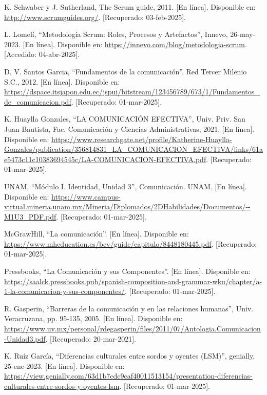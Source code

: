 \begin{thebibliography}{200}
    K. Schwaber y J. Sutherland, The Scrum guide, 2011. [En línea]. Disponible en: \url{http://www.scrumguides.org/}. [Recuperado: 03-feb-2025].

    L. Lomelí, “Metodología Scrum: Roles, Procesos y Artefactos”, Innevo, 26-may-2023. [En línea]. Disponible en: \url{https://innevo.com/blog/metodologia-scrum}. [Accedido: 04-abr-2025].

    D. V. Santos Garcia, “Fundamentos de la comunicación”. Red Tercer Milenio S.C., 2012. [En línea]. Disponible en: \url{https://dspace.itsjapon.edu.ec/jspui/bitstream/123456789/673/1/Fundamentos_de_comunicacion.pdf}. [Recuperado: 01-mar-2025].

    K. Huaylla Gonzales, “LA COMUNICACIÓN EFECTIVA”, Univ. Priv. San Juan Bautista, Fac. Comunicación y Ciencias Administrativas, 2021. [En línea]. Disponible en: \url{https://www.researchgate.net/profile/Katherine-Huaylla-Gonzales/publication/356814831_LA_COMUNICACION_EFECTIVA/links/61ae5473c11c10383694545c/LA-COMUNICACION-EFECTIVA.pdf}. [Recuperado: 01-mar-2025].

    UNAM, “Módulo I. Identidad, Unidad 3”, Comunicación. UNAM. [En línea]. Disponible en: \url{https://www.campus-virtual.mineria.unam.mx/Mineria/Diplomados/2DHabilidades/Documentos/--M1U3_PDF.pdf}. [Recuperado: 01-mar-2025].

    McGrawHill, “La comunicación”. [En línea]. Disponible en: \url{https://www.mheducation.es/bcv/guide/capitulo/8448180445.pdf}. [Recuperado: 01-mar-2025].

    Pressbooks, “La Comunicación y sus Componentes”. [En línea]. Disponible en: \url{https://saalck.pressbooks.pub/spanish-composition-and-grammar-wku/chapter/a-1-la-comunicacion-y-sus-componentes/}. [Recuperado: 01-mar-2025].

    R. Gasperin, “Barreras de la comunicación y en las relaciones humanas”, Univ. Veracruzana, pp. 95-135, 2005. [En línea]. Disponible en: \url{https://www.uv.mx/personal/rdegasperin/files/2011/07/Antologia.Comunicacion-Unidad3.pdf}. [Recuperado: 20-mar-2021].

    K. Ruíz García, “Diferencias culturales entre sordos y oyentes (LSM)”, genially, 25-ene-2023. [En línea]. Disponible en: \url{https://view.genially.com/63d1b7cdc9caf40011513154/presentation-diferencias-culturales-entre-sordos-y-oyentes-lsm}. [Recuperado: 01-mar-2025].


\end{thebibliography}
